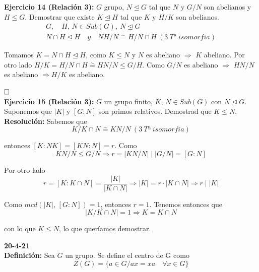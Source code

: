 \documentclass{article}
\begin{document}
\textbf{Ejercicio 14 (Relación 3):} $G$ grupo, $N\unlhd G$ tal que $N$ y $G/N$ son abelianos y $H\leq G$. Demostrar que existe $K\unlhd H$ tal que $K$ y $H/K$ son abelianos. \\
\begin{gather*}
G,\quad H,\,N\in Sub(G),\:N\unlhd G \\
N\cap H\unlhd H\quad y\quad NH/N\overset{\sim}{=}H/N\cap H\:(3\:Tª\:isomorfia)
\end{gather*}

Tomamos $K=N\cap H\unlhd H$, como $K\leq N$ y $N$ es abeliano $\Rightarrow$ $K$ abeliano. Por otro lado $H/K=H/N\cap H\overset{\sim}{=} HN/N\leq G/H$. Como $G/N$ es abeliano $\Rightarrow$ $HN/N$ es abeliano $\Rightarrow H/K$ es abeliano.

$\hfill\square$ \\

\textbf{Ejercicio 15 (Relación 3):} $G$ un grupo finito, $K,\,N\in Sub(G)$ con $N\unlhd G$. Suponemos que $|K|$ y $\left[G:N\right]$ son primos relativos. Demostrad que $K\leq N$. \\

\textbf{Resolución:} Sabemos que 
\begin{equation*}
K/K\cap N\overset{\sim}{=} KN/N\:(3\:Tª\:isomorfia)
\end{equation*}

entonces $\left[K:NK\right]=\left[KN:N\right]=r$. Como 
\begin{equation*}
KN/N\leq G/N\Rightarrow r=|KN/N| \mid |G/N|=\left[G:N\right]
\end{equation*}

Por otro lado
\begin{equation*}
r=\left[K:K\cap N\right]=\frac{|K|}{|K\cap N|}\Rightarrow |K|=r\cdot |K\cap N|\Rightarrow r\mid |K|
\end{equation*}

Como $mcd(|K|,\,\left[G:N\right])=1$, entonces $r=1$. Tenemos entonces que 
\begin{equation*}
|K/K\cap N|=1\Rightarrow K=K\cap N
\end{equation*}

con lo que $K\leq N$, lo que queríamos demostrar.

\textbf{20-4-21} \\

\textbf{Definición:} Sea $G$ un grupo. Se define el centro de G como
\begin{equation*}
Z(G)=\{a\in G/ax=xa\quad \forall x\in G\}
\end{equation*}
\end{document}
